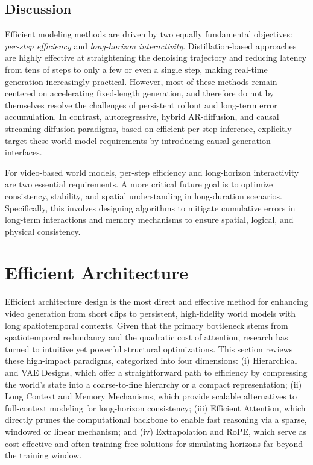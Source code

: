 \documentclass[lettersize,journal]{IEEEtran}
\begin{document}
\subsection{Discussion}
Efficient modeling methods are driven by two equally fundamental objectives: \emph{per-step efficiency} and \emph{long-horizon interactivity}.
Distillation-based approaches are highly effective at straightening the denoising trajectory and reducing latency from tens of steps to only a few or even a single step, making real-time generation increasingly practical. However, most of these methods remain centered on accelerating fixed-length generation, and therefore do not by themselves resolve the challenges of persistent rollout and long-term error accumulation. In contrast, autoregressive, hybrid AR-diffusion, and causal streaming diffusion paradigms, based on efficient per-step inference, explicitly target these world-model requirements by introducing causal generation interfaces.

For video-based world models, per-step efficiency and long-horizon interactivity are two essential requirements. A more critical future goal is to optimize consistency, stability, and spatial understanding in long-duration scenarios. Specifically, this involves designing algorithms to mitigate cumulative errors in long-term interactions and memory mechanisms to ensure spatial, logical, and physical consistency.



\section{Efficient Architecture}
\label{sec:efficient_arch}
Efficient architecture design is the most direct and effective method for enhancing video generation from short clips to persistent, high-fidelity world models with long spatiotemporal contexts. Given that the primary bottleneck stems from spatiotemporal redundancy and the quadratic cost of attention, research has turned to intuitive yet powerful structural optimizations. This section reviews these high-impact paradigms, categorized into four dimensions: (i) Hierarchical and VAE Designs, which offer a straightforward path to efficiency by compressing the world’s state into a coarse-to-fine hierarchy or a compact representation; (ii) Long Context and Memory Mechanisms, which provide scalable alternatives to full-context modeling for long-horizon consistency; (iii) Efficient Attention, which directly prunes the computational backbone to enable fast reasoning via a sparse, windowed or linear mechanism; and (iv) Extrapolation and RoPE, which serve as cost-effective and often training-free solutions for simulating horizons far beyond the training window.
\end{document}
